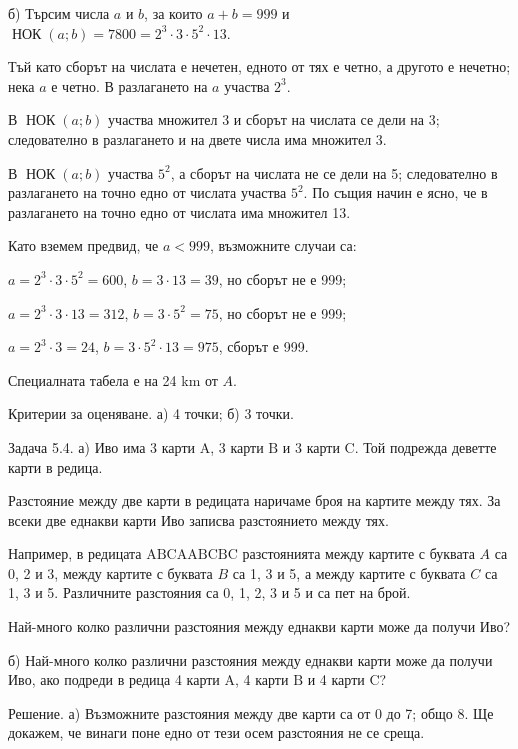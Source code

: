 б) Търсим числа $a$ и $b$, за които $a+b=999$ и $\operatorname{НОК}(a;b)=7800=2^3\cdot3\cdot5^2\cdot13$.

Тъй като сборът на числата е нечетен, едното от тях е четно, а другото е нечетно; нека $a$ е четно. В разлагането на $a$ участва $2^3$.

В $\operatorname{НОК}(a;b)$ участва множител 3 и сборът на числата се дели на 3; следователно в разлагането и на двете числа има множител 3.

В $\operatorname{НОК}(a;b)$ участва $5^2$, а сборът на числата не се дели на 5; следователно в разлагането на точно едно от числата участва $5^2$. По същия начин е ясно, че в разлагането на точно едно от числата има множител 13.

Като вземем предвид, че $a<999$, възможните случаи са:

$a=2^3\cdot3\cdot5^2=600$, $b=3\cdot13=39$, но сборът не е 999;

$a=2^3\cdot3\cdot13=312$, $b=3\cdot5^2=75$, но сборът не е 999;

$a=2^3\cdot3=24$, $b=3\cdot5^2\cdot13=975$, сборът е 999.

Специалната табела е на 24 km от $A$.

Критерии за оценяване. а) 4 точки; б) 3 точки.

Задача 5.4. а) Иво има 3 карти $\boxed{\mathrm A}$, 3 карти $\boxed{\mathrm B}$ и 3 карти $\boxed{\mathrm C}$. Той подрежда деветте карти в редица.

Разстояние между две карти в редицата наричаме броя на картите между тях. За всеки две еднакви карти Иво записва разстоянието между тях.

Например, в редицата $\boxed{\mathrm A}\boxed{\mathrm B}\boxed{\mathrm C}\boxed{\mathrm A}\boxed{\mathrm A}\boxed{\mathrm B}\boxed{\mathrm C}\boxed{\mathrm B}\boxed{\mathrm C}$ разстоянията между картите с буквата $A$ са 0, 2 и 3, между картите с буквата $B$ са 1, 3 и 5, а между картите с буквата $C$ са 1, 3 и 5. Различните разстояния са 0, 1, 2, 3 и 5 и са пет на брой.

Най-много колко различни разстояния между еднакви карти може да получи Иво?

б) Най-много колко различни разстояния между еднакви карти може да получи Иво, ако подреди в редица 4 карти $\boxed{\mathrm A}$, 4 карти $\boxed{\mathrm B}$ и 4 карти $\boxed{\mathrm C}$?

Решение. а) Възможните разстояния между две карти са от 0 до 7; общо 8. Ще докажем, че винаги поне едно от тези осем разстояния не се среща.

